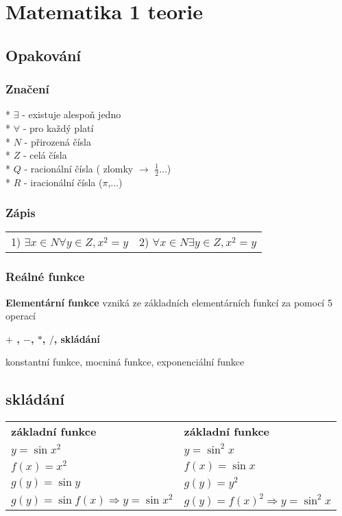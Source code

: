 



\section*{Matematika 1 teorie}
\subsection{\textbf{Opakování}}
\subsubsection{Značení}
* $\exists$ - existuje alespoň jedno \\
* $\forall$ - pro každý platí \\
* $N$ - přirozená čísla \\
* $Z$ - celá čísla \\
* $Q$ - racionální čísla ( zlomky $\rightarrow$ $\frac{1}{2}$...) \\
* $R$ - iracionální čísla ($\pi$,...) 
\subsubsection{\textbf{Zápis}}
\begin{tabular}{c || c}
    1) $\exists x \in N \forall y \in Z,x^2=y$ &
    2) $\forall x\in N \exists y \in Z, x^2=y$ \\
\end{tabular}
\subsubsection*{\textbf{Reálné funkce}}
\begin{description}
    \item \textbf{Elementární funkce} vzniká ze základních elementárních funkcí za pomocí 5 operací
    \item \textbf{$+$ , $-$, $*$, $/$, skládání}
    \item  konstantní funkce, mocniná funkce, exponenciální funkce
\end{description}

\subsection*{skládání}
\begin{tabular}{p{7.5cm} p{7.5cm}}
    \textbf{základní funkce} & \textbf{základní funkce} \\
    $y=\sin{x^2}$ & $y=\sin^2{x}$ \\
    \hline
    $f(x)=x^2$ & $f(x)=\sin{x}$  \\
    $g(y) = \sin{y}$ & $g(y) = y^2 $  \\
    $g(y)= \sin{f(x)} \Rightarrow y = \sin{x^2}$ & 
    $g(y)= f(x)^2 \Rightarrow y = \sin^2{x}$ \\
\end{tabular}
\\
